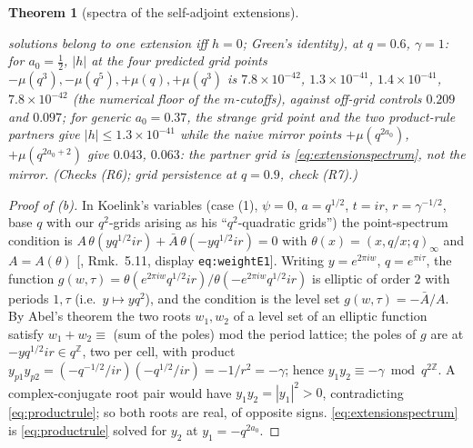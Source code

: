 \documentclass[11pt,a4paper]{article}
\theoremstyle{definition}
\theoremstyle{plain}
\newtheorem{theorem}[definition]{Theorem}
\newcommand{\Z}{\mathbb{Z}}
\begin{document}
\begin{theorem}[spectra of the self-adjoint extensions]
\begin{enumerate}[label=(\alph*)]
solutions belong to one extension iff $h=0$; Green's identity), at $q=0.6$, $\gamma=1$:
for $a_{0}=\tfrac12$, $|h|$ at the four predicted grid points
$-\mu(q^{3}),-\mu(q^{5}),+\mu(q),+\mu(q^{3})$ is
$7.8\times10^{-42}$, $1.3\times10^{-41}$, $1.4\times10^{-41}$, $7.8\times10^{-42}$
(the numerical floor of the $m$-cutoffs), against off-grid controls $0.209$ and $0.097$;
for generic $a_{0}=0.37$, the strange grid point and the two product-rule partners give
$|h|\le1.3\times10^{-41}$ while the \emph{naive mirror points} $+\mu(q^{2a_{0}})$,
$+\mu(q^{2a_{0}+2})$ give $0.043$, $0.063$: the partner grid is
\eqref{eq:extensionspectrum}, not the mirror. (Checks (R6); grid persistence at $q=0.9$,
check (R7).)
\end{enumerate}
\end{theorem}

\begin{proof}[Proof of (b)]
In Koelink's variables (case (1), $\psi=0$, $a=q^{1/2}$, $t=ir$, $r=\gamma^{-1/2}$, base
$q$ with our $q^{2}$-grids arising as his ``$q^{2}$-quadratic grids'') the point-spectrum
condition is $A\,\theta(yq^{1/2}ir)+\bar A\,\theta(-yq^{1/2}ir)=0$ with
$\theta(x)=(x,q/x;q)_{\infty}$ and $A=A(\theta)$ [\cite{Koelink:2003oneparam}, Rmk.\ 5.11,
display \texttt{eq:weightE1}]. Writing $y=e^{2\pi iw}$, $q=e^{\pi i\tau}$,
the function $g(w,\tau)=\theta(e^{2\pi iw}q^{1/2}ir)/\theta(-e^{2\pi iw}q^{1/2}ir)$ is
elliptic of order $2$ with periods $1,\tau$ (i.e.\ $y\mapsto yq^{2}$), and the condition is
the level set $g(w,\tau)=-\bar A/A$. By Abel's theorem the two roots $w_{1},w_{2}$ of a
level set of an elliptic function satisfy $w_{1}+w_{2}\equiv$ (sum of the poles) mod the
period lattice; the poles of $g$ are at $-yq^{1/2}ir\in q^{\Z}$, two per cell, with product
$y_{p1}y_{p2}=(-q^{-1/2}/ir)(-q^{1/2}/ir)=-1/r^{2}=-\gamma$; hence
$y_{1}y_{2}\equiv-\gamma\bmod q^{2\Z}$. A complex-conjugate root pair would have
$y_{1}y_{2}=|y_{1}|^{2}>0$, contradicting \eqref{eq:productrule}; so both roots are real, of
opposite signs. \eqref{eq:extensionspectrum} is \eqref{eq:productrule} solved for $y_{2}$
at $y_{1}=-q^{2a_{0}}$.
\end{proof}
\end{document}
